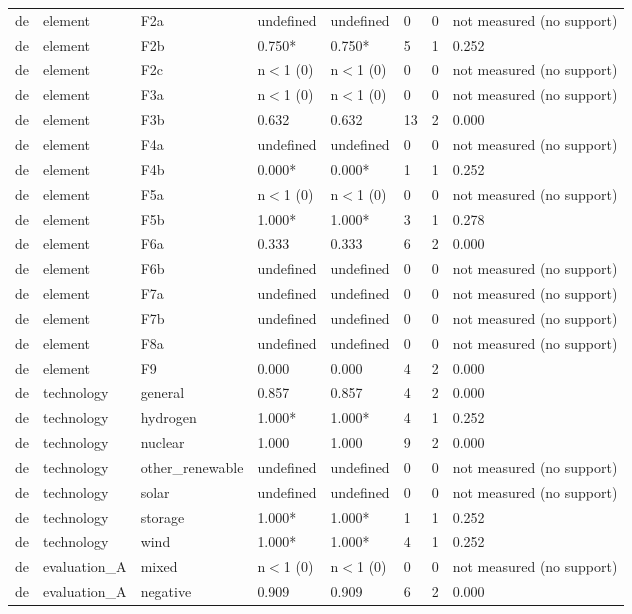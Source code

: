 \begin{table}[htbp]
\begin{tabular}{llllllll}
de & element & F2a & undefined & undefined & 0 & 0 & not measured (no support) \\
de & element & F2b & 0.750* & 0.750* & 5 & 1 & 0.252 \\
de & element & F2c & n$<$1 (0) & n$<$1 (0) & 0 & 0 & not measured (no support) \\
de & element & F3a & n$<$1 (0) & n$<$1 (0) & 0 & 0 & not measured (no support) \\
de & element & F3b & 0.632 & 0.632 & 13 & 2 & 0.000 \\
de & element & F4a & undefined & undefined & 0 & 0 & not measured (no support) \\
de & element & F4b & 0.000* & 0.000* & 1 & 1 & 0.252 \\
de & element & F5a & n$<$1 (0) & n$<$1 (0) & 0 & 0 & not measured (no support) \\
de & element & F5b & 1.000* & 1.000* & 3 & 1 & 0.278 \\
de & element & F6a & 0.333 & 0.333 & 6 & 2 & 0.000 \\
de & element & F6b & undefined & undefined & 0 & 0 & not measured (no support) \\
de & element & F7a & undefined & undefined & 0 & 0 & not measured (no support) \\
de & element & F7b & undefined & undefined & 0 & 0 & not measured (no support) \\
de & element & F8a & undefined & undefined & 0 & 0 & not measured (no support) \\
de & element & F9 & 0.000 & 0.000 & 4 & 2 & 0.000 \\
de & technology & general & 0.857 & 0.857 & 4 & 2 & 0.000 \\
de & technology & hydrogen & 1.000* & 1.000* & 4 & 1 & 0.252 \\
de & technology & nuclear & 1.000 & 1.000 & 9 & 2 & 0.000 \\
de & technology & other\_renewable & undefined & undefined & 0 & 0 & not measured (no support) \\
de & technology & solar & undefined & undefined & 0 & 0 & not measured (no support) \\
de & technology & storage & 1.000* & 1.000* & 1 & 1 & 0.252 \\
de & technology & wind & 1.000* & 1.000* & 4 & 1 & 0.252 \\
de & evaluation\_A & mixed & n$<$1 (0) & n$<$1 (0) & 0 & 0 & not measured (no support) \\
de & evaluation\_A & negative & 0.909 & 0.909 & 6 & 2 & 0.000 \\

\end{tabular}
\end{table}
